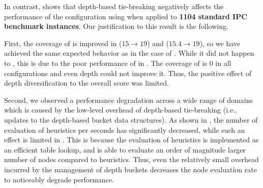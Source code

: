 In contrast,  shows that depth-based tie-breaking negatively affects the performance of
the configuration using \mands when applied to \textbf{1104 standard IPC benchmark instances}. Our justification to this result is
the following.
 
First, the coverage of  is improved in \fifo ($15\to 19$) and \ro ($15.4\to 19$), so we have achieved the same expected behavior as in the case of \lmcut.
%
While it did not happen to , this is due to the poor performance of \mands in .
The coverage of  is 0 in all configurations and even depth could not improve it. Thus, the positive
effect of depth diversification to the overall score was limited.
 
Second, we observed a performance degradation across a wide range of domains which is caused by the low-level overhead of depth-based tie-breaking (i.e., updates to the depth-based bucket data structures).
As shown in , the number of evaluation of \mands heuristics per seconds has significantly decreased,
while such an effect is limited in \lmcut.
This is because the evaluation of \mands heuristics is implemented
as an efficient table lookup, and \mands is able to evaluate an order of magnitude larger number of nodes compared to \lmcut heuristics.
Thus, even the relatively small overhead incurred by the management of depth buckets decreases the node evaluation rate to noticeably degrade performance.

